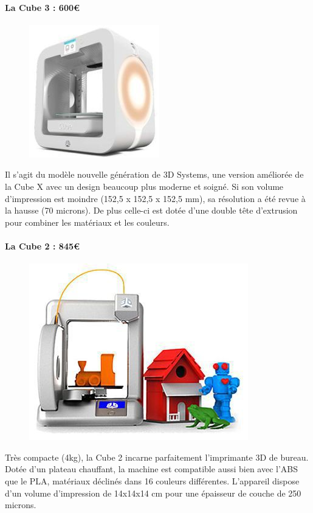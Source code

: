 \documentclass{article}
\begin{document}
\paragraph{La Cube 3 : 600\euro{}} \hfill \break
\begin{figure}[h!]
\centering
\includegraphics[scale=0.4]{./images/cube-3.png}
\end{figure}\hfill \break
Il s'agit du modèle nouvelle génération de 3D Systems, une version améliorée de la Cube X avec un design beaucoup plus moderne et soigné. Si son volume d'impression est moindre (152,5 x 152,5 x 152,5 mm), sa résolution a été revue à la hausse (70 microns). De plus celle-ci est dotée d'une double tête d'extrusion pour combiner les matériaux et les couleurs.

\paragraph{La Cube 2 : 845\euro{}} \hfill \break
\begin{figure}[h!]
\centering
\includegraphics[scale=0.4]{./images/imprimante-3d-cube.png}
\end{figure}\hfill \break
Très compacte (4kg), la Cube 2 incarne parfaitement l'imprimante 3D de bureau. Dotée d'un plateau chauffant, la machine est compatible aussi bien avec l'ABS que le PLA, matériaux déclinés dans 16 couleurs différentes. L'appareil dispose d'un volume d'impression de 14x14x14 cm pour une épaisseur de couche de 250 microns.
\newpage
\end{document}
